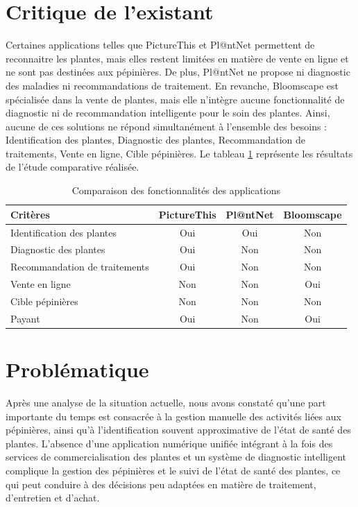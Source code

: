 \section{Critique de l'existant}
Certaines applications telles que PictureThis et Pl@ntNet permettent de reconnaitre les plantes, mais elles 
restent limitées en matière de vente en ligne et ne sont pas destinées aux pépinières. De plus, Pl@ntNet ne 
propose ni diagnostic des maladies ni recommandations de traitement. En revanche, Bloomscape est spécialisée 
dans la vente de plantes, mais elle n'intègre aucune fonctionnalité de diagnostic ni de recommandation intelligente 
pour le soin des plantes. Ainsi, aucune de ces solutions ne répond simultanément à l'ensemble des besoins : 
Identification des plantes, Diagnostic des plantes, Recommandation de traitements, Vente en ligne, Cible pépinières.
\newline
Le tableau \ref{tab:comparatif} représente les résultats de l'étude comparative réalisée.
\begin{table}[H]
\centering
\caption{Comparaison des fonctionnalités des applications}
\label{tab:comparatif}
\begin{tabular}{|l|c|c|c|}
\hline
\textbf{Critères} & \textbf{PictureThis} & \textbf{Pl@ntNet} & \textbf{Bloomscape} \\
\hline
Identification des plantes & Oui & Oui & Non \\
Diagnostic des plantes & Oui & Non & Non \\
Recommandation de traitements & Oui & Non & Non \\
Vente en ligne & Non & Non & Oui \\
Cible pépinières & Non & Non & Non \\
Payant & Oui & Non & Oui \\
\hline
\end{tabular}
\end{table}
\section{Problématique}
Après une analyse de la situation actuelle, nous avons constaté qu'une part 
importante du temps est consacrée à la gestion manuelle des activités liées aux 
pépinières, ainsi qu'à l'identification souvent approximative de l'état de santé 
des plantes. L'absence d'une application numérique unifiée intégrant à la fois des
 services de commercialisation des plantes et un système de diagnostic intelligent
  complique la gestion des pépinières et le suivi de l'état de santé des plantes, 
  ce qui peut conduire à des décisions peu adaptées en matière de traitement, 
  d'entretien et d'achat.
